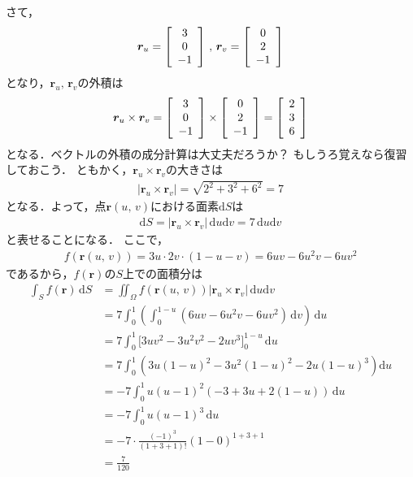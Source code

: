 さて，
\begin{align*}
\bm{r}_u = \left[
\renewcommand{\arraystretch}{1}
\begin{array}{c} 
3 \\
0 \\
-1 
\end{array}
\right]
\, , \, 
\renewcommand{\arraystretch}{1}
\bm{r}_v = \left[
\begin{array}{c}
0 \\
2 \\
-1
\end{array}
\right]
\end{align*}
となり，$\bm{r}_u, \, \bm{r}_v$の外積は
\begin{align*}
\bm{r} _u \times \bm{r}_v = \left[ 
\renewcommand{\arraystretch}{1}
\begin{array}{c}
3 \\
0 \\
-1 
\end{array}
\right]
\times 
\renewcommand{\arraystretch}{1}
\left[
\begin{array}{c}
0 \\
2 \\
-1
\end{array}
\right]
= \left[
\renewcommand{\arraystretch}{1}
\begin{array}{c}
2 \\
3 \\
6
\end{array}
\right]
\end{align*}
となる．ベクトルの外積の成分計算は大丈夫だろうか？ もしうろ覚えなら復習しておこう．
ともかく，$\bm{r}_u \times \bm{r}_v$の大きさは
\begin{align*}
\lvert \bm{r}_u \times \bm{r}_v \rvert = \sqrt{ 2^2+3^2+6^2} =7
\end{align*}
となる．よって，点$\bm{r}(u, \, v)$における面素$\mathrm{d}S$は
\begin{align*}
\mathrm{d}S = \lvert \bm{r}_u \times \bm{r}_v \rvert \, \mathrm{d}u \mathrm{d}v
= 7 \, \mathrm{d}u \mathrm{d}v
\end{align*}
と表せることになる．
ここで，
\begin{align*}
f(\bm{r}(u, \, v) ) = 3u \cdot 2v \cdot (1-u-v) = 6uv - 6u^2v - 6uv^2
\end{align*}
であるから，$f(\bm{r})$の$S$上での面積分は
\begin{align*}
\int_S f(\bm{r} ) \, \mathrm{d} S & = 
\iint_\Omega f (\bm{r} (u, \, v) ) \lvert \bm{r}_u \times \bm{r}_v \rvert \, \mathrm{d}u \mathrm{d}v \\
& = 7 \int_0^1 \left( \int_0^{1-u} (6uv-6u^2v-6uv^2) \, \mathrm{d}v \right) \, \mathrm{d}u \\
& = 7 \int_0^1 \Big[ 3uv^2 - 3u^2v^2 - 2uv^3 \Big]_0^{1-u} \, \mathrm{d} u \\
& = 7 \int_0^1 ( 3u(1-u)^2 -3u^2 (1-u)^2 - 2u (1-u)^3 ) \mathrm{d}u \\
& = -7 \int_0^1 u(u-1)^2 ( -3 + 3u + 2(1-u) ) \, \mathrm{d}u \\
& = -7 \int_0^1 u(u-1)^3 \, \mathrm{d}u \\
& = -7 \cdot \frac{ (-1)^3 } {(1+3+1) !} (1-0)^{1+3+1} \\
& = \frac{7}{120}   
\end{align*}

